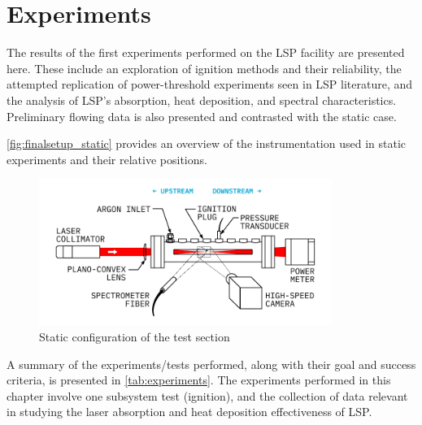 \chapter{Experiments}
    The results of the first experiments performed on the LSP facility are presented here. These include an exploration of ignition methods and their reliability, the attempted replication of power-threshold experiments seen in LSP literature, and the analysis of LSP's absorption, heat deposition, and spectral characteristics. Preliminary flowing data is also presented and contrasted with the static case.

    \autoref{fig:finalsetup_static} provides an overview of the instrumentation used in static experiments and their relative positions. 

    \begin{figure}[h]
        \centering
        \includegraphics[width=0.85\textwidth]{assets/5 results/finalsetup_static}
        \caption{Static configuration of the test section}
        \label{fig:finalsetup_static}
    \end{figure}

    A summary of the experiments/tests performed, along with their goal and success criteria, is presented in \autoref{tab:experiments}. The experiments performed in this chapter involve one subsystem test (ignition), and the collection of data relevant in studying the laser absorption and heat deposition effectiveness of LSP.

